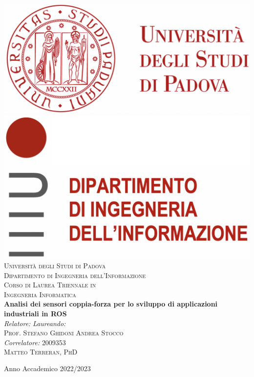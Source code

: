 
\usepackage[backend=biber, style=numeric, defernumbers]{biblatex}



\begin{titlepage}
\begin{center}

\includegraphics[scale=0.2]{images/logo_unipd.png} \hfill \includegraphics[scale=0.2]{images/logo_dei.png}\\
\vspace{0.8cm}
\textsc{\LARGE Universit\`{a} degli Studi di Padova}\\
\vspace{0.45cm}
\textsc{\large Dipartimento di Ingegneria dell'Informazione}\\
\vspace{0.4cm}
\textsc{\large Corso di Laurea Triennale in}\\
\textsc{\large Ingegneria Informatica}\\
\vfill
{ \LARGE \bfseries Analisi dei sensori coppia-forza per lo sviluppo di applicazioni industriali in ROS
}\\
\vfill
\textit{\large Relatore:} \hfill \textit{\large Laureando:}\\
\textsc{\large Prof. Stefano Ghidoni} \hfill \textsc{Andrea Stocco}\\
\textit{\large Correlatore:} \hfill \textsc{2009353}\\
\textsc{\large Matteo Terreran, PhD} \hfill \textit{}

\vfill
{\large Anno Accademico 2022/2023}
\end{center}
\end{titlepage}

